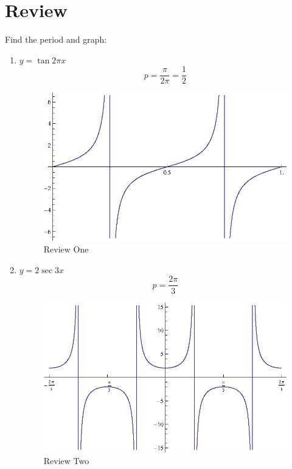 \documentclass{exam}
\begin{document}
  \fi

  \ifprintanswers
    \pagebreak
  \fi

  \section{Review}
  Find the period and graph:

  \begin{enumerate}
    \item $y = \tan 2 \pi x$
      \ifprintanswers
        \[
          p = \frac{\pi}{2 \pi} = \frac{1}{2}
        \]
        
        \begin{figure}[H]
          \centering
          \includegraphics[scale=0.7]{review1.eps}
          \caption{Review One}
        \end{figure}
      \fi

    \item $y = 2 \sec 3x$
      \ifprintanswers
        \[
          p = \frac{2 \pi}{3}
        \]
        
        \begin{figure}[H]
          \centering
          \includegraphics[scale=0.7]{review2.eps}
          \caption{Review Two}
        \end{figure}
      \fi

  \end{enumerate}
\end{document}
